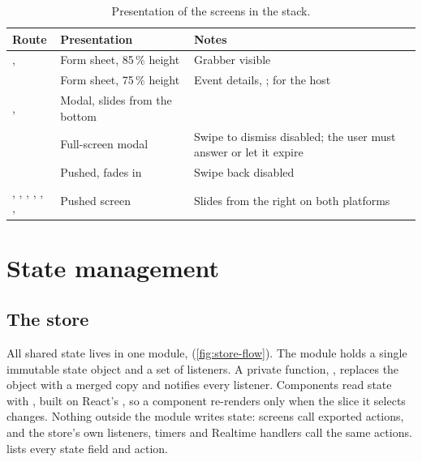 \begin{table}[ht]
  \centering
  \caption{Presentation of the screens in the  stack.}
  \label{tab:presentations}
  \tablefont
  \begin{tabularx}{\textwidth}{@{}L{40mm}L{40mm}Y@{}}
    \toprule
    \textsf{\textbf{Route}} & \textsf{\textbf{Presentation}} & \textsf{\textbf{Notes}} \\
    \midrule
    ,  & Form sheet, 85\,\% height & Grabber visible \\
     & Form sheet, 75\,\% height & Event details, ;  for the host \\
    ,  & Modal, slides from the bottom & \\
     & Full-screen modal & Swipe to dismiss disabled; the user must answer or let it expire \\
     & Pushed, fades in & Swipe back disabled \\
    , , , , , ,  & Pushed screen & Slides from the right on both platforms \\
    \bottomrule
  \end{tabularx}
\end{table}

\section{State management}
\label{sec:state}

\subsection{The store}

All shared state lives in one module,  (\cref{fig:store-flow}). The module holds
a single immutable state object and a set of listeners. A private function, , replaces
the object with a merged copy and notifies every listener. Components read state with
, built on React's , so a component re-renders only
when the slice it selects changes. Nothing outside the module writes state: screens call exported actions,
and the store's own listeners, timers and Realtime handlers call the same actions.
 lists every state field and action.

